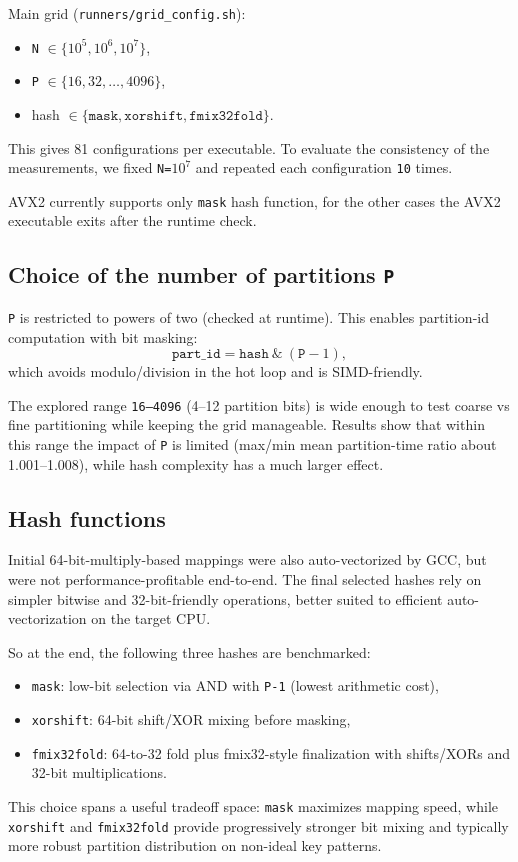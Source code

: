 \documentclass[11pt,a4paper]{article}
\begin{document}
Main grid (\texttt{runners/grid\_config.sh}):
\begin{itemize}
    \item \texttt{N} $\in \{10^5,10^6,10^7\}$,
    \item \texttt{P} $\in \{16,32,\ldots,4096\}$,
    \item hash $\in \{\texttt{mask}, \texttt{xorshift}, \texttt{fmix32fold}\}$.
\end{itemize}
This gives 81 configurations per executable. To evaluate the consistency of the measurements, we fixed \texttt{N=$10^7$} and repeated each configuration \texttt{10} times.

AVX2 currently supports only \texttt{mask} hash function, for the other cases the AVX2 executable exits after the runtime check.

\subsection{Choice of the number of partitions \texttt{P}}
\texttt{P} is restricted to powers of two (checked at runtime). This enables partition-id computation with bit masking:
\[
\texttt{part\_id} = \texttt{hash} \ \&\ (\texttt{P}-1),
\]
which avoids modulo/division in the hot loop and is SIMD-friendly.

The explored range \texttt{16--4096} (4--12 partition bits) is wide enough to test coarse vs fine partitioning while keeping the grid manageable. Results show that within this range the impact of \texttt{P} is limited (max/min mean partition-time ratio about 1.001--1.008), while hash complexity has a much larger effect.

\subsection{Hash functions}
Initial 64-bit-multiply-based mappings were also auto-vectorized by GCC, but were not performance-profitable end-to-end. The final selected hashes rely on simpler bitwise and 32-bit-friendly operations, better suited to efficient auto-vectorization on the target CPU.

So at the end, the following three hashes are benchmarked:
\begin{itemize}
    \item \texttt{mask}: low-bit selection via AND with \texttt{P-1} (lowest arithmetic cost),
    \item \texttt{xorshift}: 64-bit shift/XOR mixing before masking,
    \item \texttt{fmix32fold}: 64-to-32 fold plus fmix32-style finalization with shifts/XORs and 32-bit multiplications.
\end{itemize}
This choice spans a useful tradeoff space: \texttt{mask} maximizes mapping speed, while \texttt{xorshift} and \texttt{fmix32fold} provide progressively stronger bit mixing and typically more robust partition distribution on non-ideal key patterns.
\end{document}
